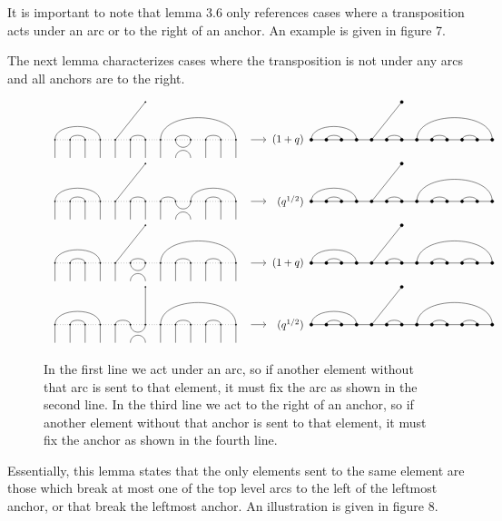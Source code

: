 \documentclass{amsart}
\begin{document}
\vspace{5mm}
It is important to note that lemma 3.6 only references cases where a transposition acts under an arc or to the right of an anchor. An example is given in figure 7. 

The next lemma characterizes cases where the transposition is not under any arcs and all anchors are to the right.

\begin{figure}[b]
	\[
	\begin{tabular}{l l l l}
	\GeneralizedAction{13}{1/4,2/3,6/7,8/13,9/10,11/12}{1}{5/1}{5/4}{9}{1/4,2/3,6/7,8/13,9/10,11/12}{5/1}{(1+q)}\\
	
	\GeneralizedAction{13}{1/4,2/3,6/7,8/9,10/13,11/12}{1}{5/1}{5/4}{9}{1/4,2/3,6/7,8/13,9/10,11/12}{5/1}{(q^{1/2})}\\
	
	\GeneralizedAction{13}{1/4,2/3,6/7,8/13,9/10,11/12}{1}{5/1}{5/4}{6}{1/4,2/3,6/7,8/13,9/10,11/12}{5/1}{(1+q)}\\
	
	\GeneralizedAction{13}{1/4,2/3,5/6,8/13,9/10,11/12}{1}{7/1}{5/4}{6}{1/4,2/3,6/7,8/13,9/10,11/12}{5/1}{(q^{1/2})}\\
	
	\end{tabular}
	\]
	
	\caption{In the first line we act under an arc, so if another element without that arc is sent to that element, it must fix the arc as shown in the second line. In the third line we act to the right of an anchor, so if another element without that anchor is sent to that element, it must fix the anchor as shown in the fourth line. 
	}
	\label{Action}
\end{figure}

Essentially, this lemma states that the only elements sent to the same element are those which break at most one of the top level arcs to the left of the leftmost anchor, or that break the leftmost anchor. An illustration is given in figure 8.
\end{document}
